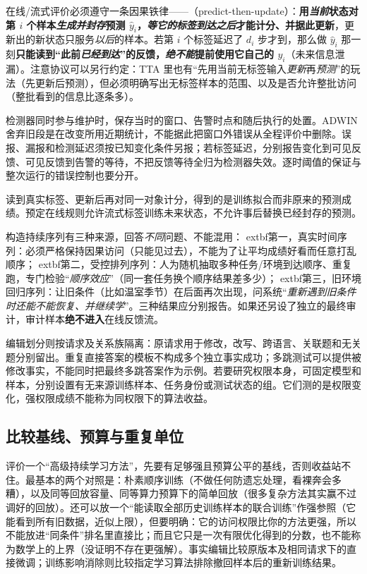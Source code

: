 在线/流式评价必须遵守一条因果铁律——（predict-then-update）：\textbf{用\emph{当前}状态对第 $i$ 个样本\emph{生成并\emph{封存}}预测 $\hat y_i$，\emph{等它的标签\emph{到达之后}}才能计分、并据此更新}，更新出的新状态只服务\emph{以后}的样本。若第 $i$ 个标签延迟了 $d_i$ 步才到，那么做 $\hat y_i$ 那一刻\textbf{只能读到“此前\emph{已经到达}”的反馈，\emph{绝不能}提前使用它自己的 $y_i$}（未来信息泄漏）。注意协议可以另行约定：TTA 里也有“先用当前无标签输入\emph{更新}再\emph{预测}”的玩法（先更新后预测），但必须明确写出无标签样本的范围、以及是否允许整批访问（整批看到的信息比逐条多）。

检测器同时参与维护时，保存当时的窗口、告警时点和随后执行的处置。ADWIN舍弃旧段是在改变所用近期统计，不能据此把窗口外错误从全程评价中删除。误报、漏报和检测延迟须按已知变化条件另报；若标签延迟，分别报告变化到可见反馈、可见反馈到告警的等待，不把反馈等待全归为检测器失效。逐时阈值的保证与整次运行的错误控制也要分开。

读到真实标签、更新后再对同一对象计分，得到的是训练拟合而非原来的预测成绩。预定在线规则允许流式标签训练未来状态，不允许事后替换已经封存的预测。

构造持续序列有三种来源，回答\emph{不同}问题、不能混用：	extbf{第一，真实时间序列}：必须严格保持因果访问（只能见过去），不能为了让平均成绩好看而任意打乱顺序；	extbf{第二，受控排列序列}：人为随机抽取多种任务/环境到达顺序、重复跑，专门检验“\emph{顺序效应}”（同一套任务换个顺序结果差多少）；	extbf{第三，旧环境回归序列}：让旧条件（比如温室季节）在后面再次出现，问系统“\emph{重新遇到旧条件时还能不能\emph{恢复}、并\emph{继续}学}”。三种结果应分别报告。如果还另设了独立的最终审计，审计样本\textbf{绝不进入}在线反馈流。

编辑划分则按请求及关系族隔离：原请求用于修改，改写、跨语言、关联题和无关题分别留出。重复直接答案的模板不构成多个独立事实成功；多跳测试可以提供被修改事实，不能同时把最终多跳答案作为示例。若要研究权限本身，可固定模型和样本，分别设置有无来源训练样本、任务身份或测试状态的组。它们测的是权限变化，强权限成绩不能称为同权限下的算法收益。


\subsection{比较基线、预算与重复单位}
\label{sec:ket-evolution-evaluation-controls}

评价一个“高级持续学习方法”，先要有足够强且预算公平的基线，否则收益站不住。最基本的两个对照是：朴素顺序训练（不做任何防遗忘处理，看裸奔会多糟），以及同等回放容量、同等算力预算下的简单回放（很多复杂方法其实赢不过调好的回放）。还可以放一个“能读取全部历史训练样本的联合训练”作强参照（它能看到所有旧数据，近似上限），但要明确：它的访问权限比你的方法更强，所以不能放进“同条件”排名里直接比；而且它只是一次有限优化得到的分数，也不能称为数学上的上界（没证明不存在更强解）。事实编辑比较原版本及相同请求下的直接微调；训练影响消除则比较指定学习算法排除撤回样本后的重新训练结果。

